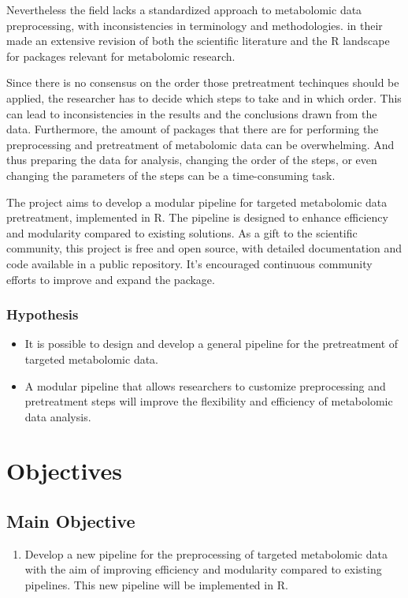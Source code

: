 \documentclass[ENG, BIB]{TFUOC}%
\begin{document}
Nevertheless the field lacks a standardized approach to metabolomic data preprocessing, with inconsistencies in terminology and methodologies.
\citeauthor{stanstrupMetaRbolomicsToolboxBioconductor2019} in their  made an extensive revision of both the scientific literature and the R landscape for packages relevant for metabolomic research.

Since there is no consensus on the order those pretreatment techinques should be applied, the researcher has to decide which steps to take and in which order. This can lead to inconsistencies in the results and the conclusions drawn from the data. Furthermore, the amount of packages that there are for performing the preprocessing and pretreatment of metabolomic data can be overwhelming. And thus preparing the data for analysis, changing the order of the steps, or even changing the parameters of the steps can be a time-consuming task.

The project aims to develop a modular pipeline for targeted metabolomic data pretreatment, implemented in R. The pipeline is designed to enhance efficiency and modularity compared to existing solutions. As a gift to the scientific community, this project is free and open source, with detailed documentation and code available in a public repository. It's encouraged continuous community efforts to improve and expand the package.


\subsection{Hypothesis}


\begin{itemize}
    \item It is possible to design and develop a general pipeline for the pretreatment of targeted metabolomic data.
    \item A modular pipeline that allows researchers to customize preprocessing and pretreatment steps will improve the flexibility and efficiency of metabolomic data analysis.
\end{itemize}

\chapter{Objectives}

\section{Main Objective}
\begin{enumerate}
    \item Develop a new pipeline for the preprocessing of targeted metabolomic data with the aim of improving efficiency and modularity compared to existing pipelines. This new pipeline will be implemented in R.
\end{enumerate}
\end{document}

